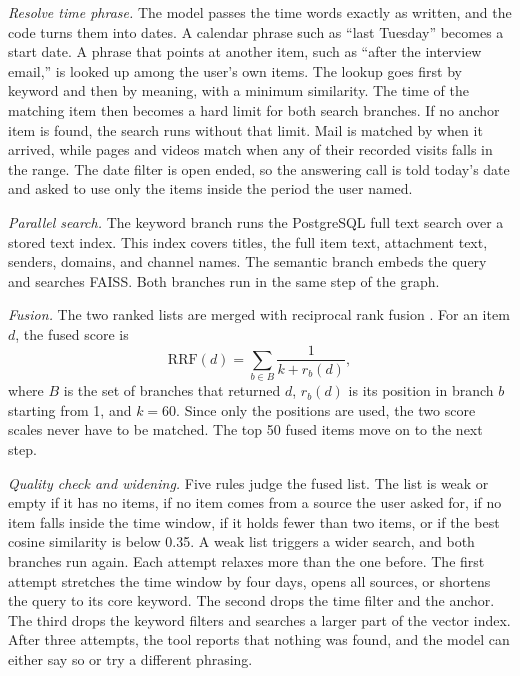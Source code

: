 \documentclass[conference]{IEEEtran}
\begin{document}
\textit{Resolve time phrase.} The model passes the time words exactly as written, and the code turns them into dates. A calendar phrase such as ``last Tuesday'' becomes a start date. A phrase that points at another item, such as ``after the interview email,'' is looked up among the user's own items. The lookup goes first by keyword and then by meaning, with a minimum similarity. The time of the matching item then becomes a hard limit for both search branches. If no anchor item is found, the search runs without that limit. Mail is matched by when it arrived, while pages and videos match when any of their recorded visits falls in the range. The date filter is open ended, so the answering call is told today's date and asked to use only the items inside the period the user named.

\textit{Parallel search.} The keyword branch runs the PostgreSQL full text search over a stored text index. This index covers titles, the full item text, attachment text, senders, domains, and channel names. The semantic branch embeds the query and searches FAISS. Both branches run in the same step of the graph.

\textit{Fusion.} The two ranked lists are merged with reciprocal rank fusion \cite{b9}. For an item $d$, the fused score is
\begin{equation}
\mathrm{RRF}(d) = \sum_{b \in B} \frac{1}{k + r_b(d)}, \label{eq:rrf}
\end{equation}
where $B$ is the set of branches that returned $d$, $r_b(d)$ is its position in branch $b$ starting from 1, and $k = 60$. Since only the positions are used, the two score scales never have to be matched. The top 50 fused items move on to the next step.

\textit{Quality check and widening.} Five rules judge the fused list. The list is weak or empty if it has no items, if no item comes from a source the user asked for, if no item falls inside the time window, if it holds fewer than two items, or if the best cosine similarity is below 0.35. A weak list triggers a wider search, and both branches run again. Each attempt relaxes more than the one before. The first attempt stretches the time window by four days, opens all sources, or shortens the query to its core keyword. The second drops the time filter and the anchor. The third drops the keyword filters and searches a larger part of the vector index. After three attempts, the tool reports that nothing was found, and the model can either say so or try a different phrasing.
\end{document}
